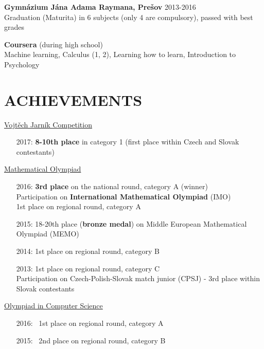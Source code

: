 \documentclass[margin, 10pt]{res} %
\begin{document}
\begin{resume}
		
		
		\textbf{Gymnázium Jána Adama Raymana, Prešov  
		}\hfill 2013-2016\\
		Graduation (Maturita) in 6 subjects (only 4 are compulsory), passed with best grades
		
		\textbf{Coursera} (during high school)  \\
		Machine learning, Calculus (1, 2), Learning how to learn, Introduction to Psychology
		
		\section{ACHIEVEMENTS}
		\href{http://vjimc.osu.cz/j27/j27results1.html}{Vojtěch Jarník Competition}
		\begin{itemize} \itemsep -2pt %
			\item[2017:] \textbf{8-10th place} in category 1 (first place within Czech and Slovak contestants)
		\end{itemize}
		
		\href{https://skmo.sk/poradia.php?podlink=ucastnici&uid=7082}{ Mathematical Olympiad}
		\begin{itemize} \itemsep -2pt %
			\item[2016:] 
			\textbf{3rd place} on the national round, category A (winner) \\
			Participation on \textbf{International Mathematical Olympiad} (IMO) \\
			1st place on regional round, category A
			\item[2015:]  18-20th place (\textbf{bronze medal}) on Middle European Mathematical Olympiad (MEMO)
			\item[2014:]  1st place on regional round, category B
			\item[2013:]  1st place on regional round, category C \\
			Participation on Czech-Polish-Slovak match junior (CPSJ) - 3rd place within Slovak contestants
		\end{itemize}
		\href{http://oi.sk/archive.php}{Olympiad in Computer Science}
		\begin{itemize} \itemsep -2pt %
			\item[2016:] \ 1st place on regional round, category A
			\item[2015:] \ 2nd place on regional round, category B
		\end{itemize}
		

\end{resume}
\end{document}
